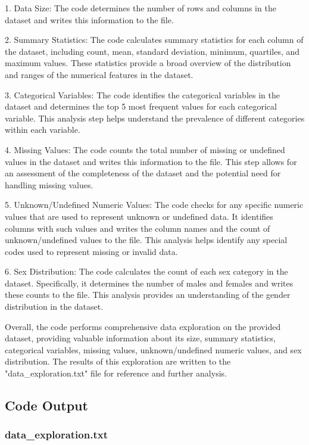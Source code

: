 \documentclass[11pt]{article}
\begin{document}
1. Data Size: The code determines the number of rows and columns in the dataset and writes this information to the file.

2. Summary Statistics: The code calculates summary statistics for each column of the dataset, including count, mean, standard deviation, minimum, quartiles, and maximum values. These statistics provide a broad overview of the distribution and ranges of the numerical features in the dataset.

3. Categorical Variables: The code identifies the categorical variables in the dataset and determines the top 5 most frequent values for each categorical variable. This analysis step helps understand the prevalence of different categories within each variable.

4. Missing Values: The code counts the total number of missing or undefined values in the dataset and writes this information to the file. This step allows for an assessment of the completeness of the dataset and the potential need for handling missing values.

5. Unknown/Undefined Numeric Values: The code checks for any specific numeric values that are used to represent unknown or undefined data. It identifies columns with such values and writes the column names and the count of unknown/undefined values to the file. This analysis helps identify any special codes used to represent missing or invalid data.

6. Sex Distribution: The code calculates the count of each sex category in the dataset. Specifically, it determines the number of males and females and writes these counts to the file. This analysis provides an understanding of the gender distribution in the dataset.

Overall, the code performs comprehensive data exploration on the provided dataset, providing valuable information about its size, summary statistics, categorical variables, missing values, unknown/undefined numeric values, and sex distribution. The results of this exploration are written to the "data\_exploration.txt" file for reference and further analysis.

\subsection{Code Output}

\subsubsection*{data\_exploration.txt}
\end{document}
